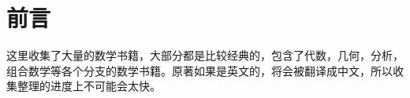 
\chapter*{前言}
这里收集了大量的数学书籍，大部分都是比较经典的，包含了代数，几何，分析，组合数学等各个分支的数学书籍。原著如果是英文的，将会被翻译成中文，所以收集整理的进度上不可能会太快。

